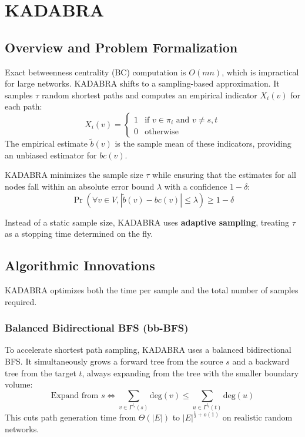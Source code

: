 \chapter{KADABRA}
\section{Overview and Problem Formalization}

Exact betweenness centrality (BC) computation is $O(mn)$, which is impractical for large networks. KADABRA shifts to a sampling-based approximation. It samples $\tau$ random shortest paths and computes an empirical indicator $X_i(v)$ for each path:
\begin{equation}
    X_i(v) = \begin{cases} 1 & \text{if } v \in \pi_i \text{ and } v \neq s, t \\ 0 & \text{otherwise} \end{cases}
\end{equation}
The empirical estimate $\tilde{b}(v)$ is the sample mean of these indicators, providing an unbiased estimator for $bc(v)$.

KADABRA minimizes the sample size $\tau$ while ensuring that the estimates for all nodes fall within an absolute error bound $\lambda$ with a confidence $1-\delta$:
\begin{equation}
    \Pr(\forall v \in V, |\tilde{b}(v) - bc(v)| \le \lambda) \ge 1 - \delta
\end{equation}

Instead of a static sample size, KADABRA uses \textbf{adaptive sampling}, treating $\tau$ as a stopping time determined on the fly. 

\section{Algorithmic Innovations}

KADABRA optimizes both the time per sample and the total number of samples required.

\subsection{Balanced Bidirectional BFS (bb-BFS)}
To accelerate shortest path sampling, KADABRA uses a balanced bidirectional BFS. It simultaneously grows a forward tree from the source $s$ and a backward tree from the target $t$, always expanding from the tree with the smaller boundary volume:
\begin{equation}
\text{Expand from } s \iff \sum_{v \in \Gamma^{l_s}(s)} \text{deg}(v) \le \sum_{u \in \Gamma^{l_t}(t)} \text{deg}(u)
\end{equation}
This cuts path generation time from $\Theta(|E|)$ to $|E|^{\frac{1}{2}+o(1)}$ on realistic random networks.

